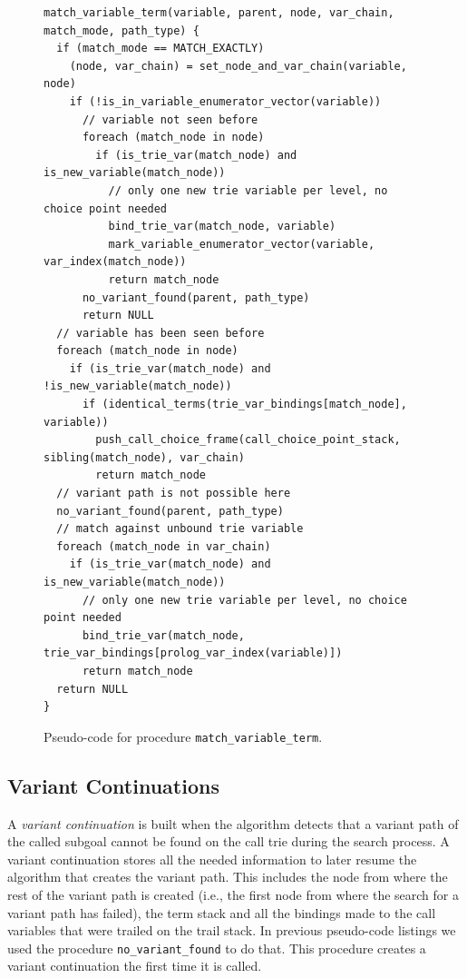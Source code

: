 \begin{figure}[ht]
\begin{Verbatim}
match_variable_term(variable, parent, node, var_chain, match_mode, path_type) {
  if (match_mode == MATCH_EXACTLY)
    (node, var_chain) = set_node_and_var_chain(variable, node)
    if (!is_in_variable_enumerator_vector(variable))
      // variable not seen before
      foreach (match_node in node)
        if (is_trie_var(match_node) and is_new_variable(match_node))
          // only one new trie variable per level, no choice point needed
          bind_trie_var(match_node, variable)
          mark_variable_enumerator_vector(variable, var_index(match_node))
          return match_node
      no_variant_found(parent, path_type)
      return NULL
  // variable has been seen before
  foreach (match_node in node)
    if (is_trie_var(match_node) and !is_new_variable(match_node))
      if (identical_terms(trie_var_bindings[match_node], variable))
        push_call_choice_frame(call_choice_point_stack, sibling(match_node), var_chain)
        return match_node
  // variant path is not possible here
  no_variant_found(parent, path_type)
  // match against unbound trie variable
  foreach (match_node in var_chain)
    if (is_trie_var(match_node) and is_new_variable(match_node))
      // only one new trie variable per level, no choice point needed
      bind_trie_var(match_node, trie_var_bindings[prolog_var_index(variable)])
      return match_node
  return NULL
}
\end{Verbatim}
\caption{Pseudo-code for procedure \texttt{match\_variable\_term}.}
\label{fig:match_variable}
\end{figure}

\subsection{Variant Continuations}

A \textit{variant continuation} is built when the algorithm detects that a variant path of the
called subgoal cannot be found on the call trie during the search process.
A variant continuation stores all the needed information to later resume
the algorithm that creates the variant path. This includes the node from where the rest of the variant
path is created (i.e., the first node from where the search for a variant path has failed),
the term stack and all the bindings made to the call variables that were trailed on the trail stack.
In previous pseudo-code listings we used the procedure \texttt{no\_variant\_found} to do that.
This procedure creates a variant continuation the first time it is called.

